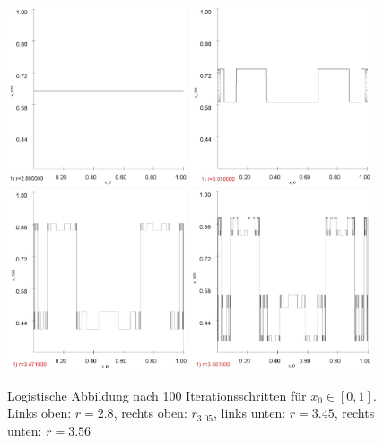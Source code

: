 \documentclass[12pt,a4paper]{article}
\begin{document}
\begin{figure}[!htbp]
	\centering
	\includegraphics[width=200px]{logi/kurve280}
	\includegraphics[width=200px]{logi/kurve305}
	\includegraphics[width=200px]{logi/kurve347}
	\includegraphics[width=200px]{logi/kurve356}
	\caption{Logistische Abbildung nach 100 Iterationsschritten für $x_0\in[0,1]$. Links oben: $r=2.8$, rechts oben: $r_3.05$, links unten: $r=3.45$, rechts unten: $r=3.56$}
	\label{fig:logi-kont}
\end{figure}
\newpage
\end{document}

